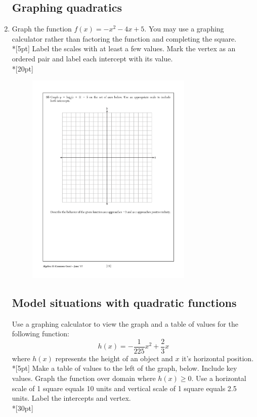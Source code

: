 \documentclass[]{book}
\begin{document}
\begin{enumerate}
\newpage
\subsection*{Graphing quadratics}
\item Graph the function $f(x)=-x^2-4x+5$. You may use a graphing calculator rather than factoring the function and completing the square.\\*[5pt]
Label the scales with at least a few values. Mark the vertex as an ordered pair and label each intercept with its value.\\*[20pt]

\begin{figure}[!ht]
    \centering
    \includegraphics[width=0.75\textwidth]{regents-grid.pdf}
\end{figure}

\newpage
\subsection*{Model situations with quadratic functions}

Use a graphing calculator to view the graph and a table of values for the following function:
\[h(x)=-\frac{1}{225}x^2+\frac{2}{3}x\]
where $h(x)$ represents the height of an object and $x$ it's horizontal position.\\*[5pt]
Make a table of values to the left of the graph, below. Include key values. Graph the function over domain where $h(x) \geq 0$. Use a horizontal scale of 1 square equals 10 units and vertical scale of 1 square equals 2.5 units. Label the intercepts and vertex.\\*[30pt]


\end{enumerate}
\end{document}
